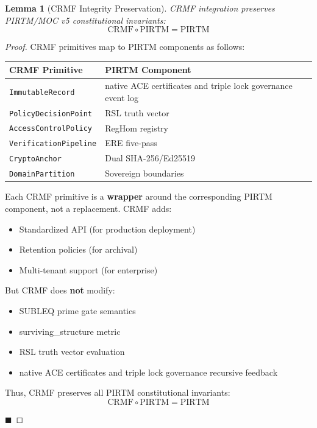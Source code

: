 \documentclass[11pt,a4paper]{article}
\newtheorem{lemma}[theorem]{Lemma}
\begin{document}
\begin{lemma}[CRMF Integrity Preservation]\label{lemma:crmf_integrity}
CRMF integration preserves PIRTM/MOC v5 constitutional invariants:
$$\text{CRMF} \circ \text{PIRTM} = \text{PIRTM}$$
\end{lemma}

\begin{proof}
CRMF primitives map to PIRTM components as follows:
\begin{table}[h]
\centering
\begin{tabular}{@{}l l@{}}
\toprule
\textbf{CRMF Primitive} & \textbf{PIRTM Component} \\
\midrule
\texttt{ImmutableRecord} & native ACE certificates and triple lock governance event log \\
\texttt{PolicyDecisionPoint} & RSL truth vector \\
\texttt{AccessControlPolicy} & RegHom registry \\
\texttt{VerificationPipeline} & ERE five-pass \\
\texttt{CryptoAnchor} & Dual SHA-256/Ed25519 \\
\texttt{DomainPartition} & Sovereign boundaries \\
\bottomrule
\end{tabular}
\end{table}

Each CRMF primitive is a \textbf{wrapper} around the corresponding PIRTM component, not a replacement. CRMF adds:
\begin{itemize}
    \item Standardized API (for production deployment)
    \item Retention policies (for archival)
    \item Multi-tenant support (for enterprise)
\end{itemize}

But CRMF does \textbf{not} modify:
\begin{itemize}
    \item SUBLEQ prime gate semantics
    \item surviving\_structure metric
    \item RSL truth vector evaluation
    \item native ACE certificates and triple lock governance recursive feedback
\end{itemize}

Thus, CRMF preserves all PIRTM constitutional invariants:
$$\text{CRMF} \circ \text{PIRTM} = \text{PIRTM}$$

\hfill $\blacksquare$
\end{proof}
\end{document}
